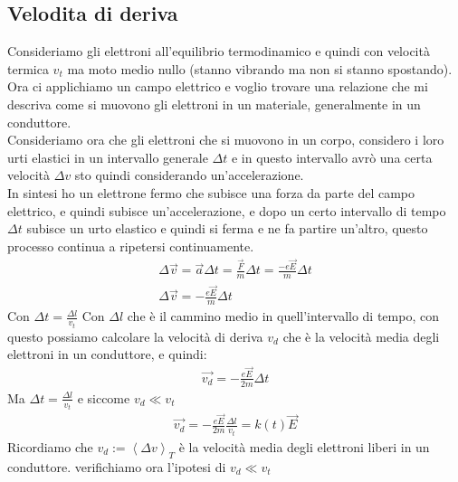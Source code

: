 \documentclass[a4paper, oneside]{article}
\begin{document}
\subsection{Velodita di deriva}
Consideriamo gli elettroni all'equilibrio termodinamico e quindi con velocità termica $v_t$ ma moto medio nullo (stanno vibrando ma non si stanno spostando).\\
Ora ci applichiamo un campo elettrico e voglio trovare una relazione che mi descriva come si muovono gli elettroni in un materiale, generalmente in un conduttore.\\
Consideriamo ora che gli elettroni che si muovono in un corpo, considero i loro urti elastici in un intervallo generale $\Delta t$ e in questo intervallo avrò una certa velocità $\Delta v$ sto quindi considerando un'accelerazione.\\
In sintesi ho un elettrone fermo che subisce una forza da parte del campo elettrico, e quindi subisce un'accelerazione, e dopo un certo intervallo di tempo $\Delta t$ subisce un urto elastico e quindi si ferma e ne fa partire un'altro, questo processo continua a ripetersi continuamente.\\
\begin{gather*}
    \Delta \vec{v} = \vec{a} \Delta t = \frac{\vec{F}}{m} \Delta t = \frac{-e \vec{E}}{m} \Delta t\\
    \Delta \vec{v} = -\frac{e \vec{E}}{m} \Delta t
\end{gather*}
Con $\Delta t = \frac{\Delta l}{v_t}$ Con $\Delta l$ che è il cammino medio in quell'intervallo di tempo, con questo possiamo calcolare la velocità di deriva $v_d$ che è la velocità media degli elettroni in un conduttore, e quindi:
\begin{gather*}
    \vec{v_d} =-\frac{e \vec{E}}{2m} \Delta t
\end{gather*}
Ma $\Delta t= \frac{\Delta l}{v_t}$ e siccome $v_d \ll v_t$
\begin{gather*}
    \vec{v_d} = - \frac{e \vec{E}}{2m} \frac{\Delta l}{v_t} = k(t) \vec{E}
\end{gather*}
Ricordiamo che $v_d := \left\langle \Delta v\right\rangle_T$ è la velocità media degli elettroni liberi in un conduttore.
verifichiamo ora l'ipotesi di $v_d \ll v_t$
\end{document}
